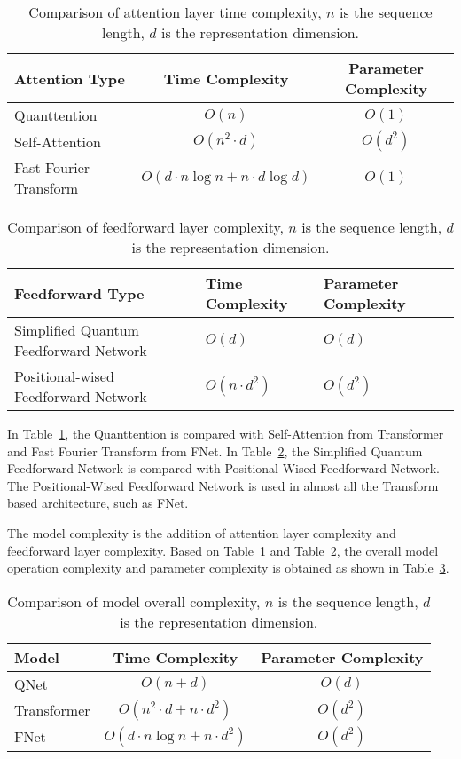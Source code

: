 \begin{table}[htb!]
    \centering
    \begin{tabular}{ l|cc  }
        \hline
        Attention Type & Time Complexity & Parameter Complexity\\
        \hline
        Quanttention & $O(n)$ & $O(1)$\\
        Self-Attention &  $O(n^2 \cdot d)$ & $O(d^2)$\\
        Fast Fourier Transform & $O(d \cdot  n \log n + n \cdot d \log d)$ & $O(1)$\\
        \hline
    \end{tabular}
    \caption{Comparison of attention layer time complexity, $n$ is the sequence length, $d$ is the representation dimension.}
    \label{table:attentions}
\end{table}

\begin{table}[htb!]
    \centering
    \begin{tabular}{ p{3.5cm}|m{1.7cm}m{1.7cm}  }
        \hline
        Feedforward Type & Time Complexity & Parameter Complexity\\
        \hline
        Simplified Quantum Feedforward Network & $O(d)$ & $O(d)$\\
        Positional-wised Feedforward Network &  $O(n \cdot d^2)$ & $O(d^2)$ \\
        \hline
    \end{tabular}
    \caption{Comparison of feedforward layer complexity, $n$ is the sequence length, $d$ is the representation dimension.}
    \label{table:feedforward}
\end{table}


In Table~\ref{table:attentions}, the Quanttention is compared with Self-Attention from Transformer and Fast Fourier Transform from FNet. In Table~\ref{table:feedforward}, the Simplified Quantum Feedforward Network is compared with Positional-Wised Feedforward Network. The Positional-Wised Feedforward Network is used in almost all the Transform based architecture, such as FNet. 

The model complexity is the addition of attention layer complexity and feedforward layer complexity. Based on Table~\ref{table:attentions} and Table~\ref{table:feedforward}, the overall model operation complexity and parameter complexity is obtained as shown in Table~\ref{table:overall}.

\begin{table}[htb!]
    \centering
    \begin{tabular}{ l|c|c  }
        \hline
        Model & Time Complexity & Parameter Complexity \\
        \hline
        QNet & $O(n + d)$ & $O(d)$\\
        Transformer &  $O(n^2 \cdot d + n \cdot d^2)$ &  $O(d^2)$ \\
        FNet &  $O(d \cdot  n \log n + n \cdot d^2)$ &  $O(d^2)$ \\
        \hline
    \end{tabular}
    \caption{Comparison of model overall complexity, $n$ is the sequence length, $d$ is the representation dimension.}
    \label{table:overall}
\end{table}

